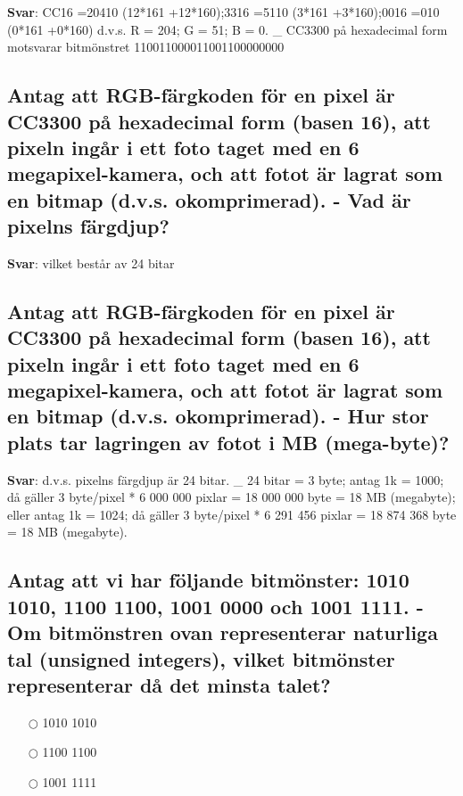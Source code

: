 \documentclass[a4paper,11pt,oneside]{article}
\begin{document}
\begin{sloppypar}
\label{q:35400:sa:sv:True}

\textbf{Svar}: CC16 =20410 (12*161 +12*160);3316 =5110 (3*161 +3*160);0016 =010 (0*161 +0*160) d.v.s. R = 204; G = 51; B = 0. _  CC3300 p\r{a} hexadecimal form motsvarar bitm\"onstret 110011000011001100000000

\subsection{Antag att RGB-f\"argkoden f\"or en pixel \"ar CC3300 p\r{a} hexadecimal form (basen 16), att pixeln ing\r{a}r i ett foto taget med en 6 megapixel-kamera, och att fotot \"ar lagrat som en bitmap (d.v.s. okomprimerad). - Vad \"ar pixelns f\"argdjup?}

\label{q:3540001:sa:sv:True}

\textbf{Svar}:  vilket best\r{a}r av 24 bitar

\subsection{Antag att RGB-f\"argkoden f\"or en pixel \"ar CC3300 p\r{a} hexadecimal form (basen 16), att pixeln ing\r{a}r i ett foto taget med en 6 megapixel-kamera, och att fotot \"ar lagrat som en bitmap (d.v.s. okomprimerad). - Hur stor plats tar lagringen av fotot i MB (mega-byte)?}

\label{q:354000102:sa:sv:True}

\textbf{Svar}:  d.v.s. pixelns f\"argdjup \"ar 24 bitar. _ 24 bitar = 3 byte; antag 1k = 1000; d\r{a} g\"aller 3 byte/pixel * 6 000 000 pixlar = 18 000 000 byte = 18 MB (megabyte); eller antag 1k = 1024; d\r{a} g\"aller 3 byte/pixel * 6 291 456 pixlar = 18 874 368 byte = 18 MB (megabyte).



\subsection{Antag att vi har f\"oljande bitm\"onster: 1010 1010, 1100 1100, 1001 0000 och 1001 1111. - Om bitm\"onstren ovan representerar naturliga tal (unsigned integers), vilket bitm\"onster representerar d\r{a} det minsta talet?}

\label{q:35500:mc:sv:True}

\begin{itemize}
  \item[$\bigcirc$] 1010 1010
  \item[$\bigcirc$] 1100 1100
  \item[$\bigcirc$] 1001 1111
\end{itemize}


\end{sloppypar}
\end{document}
